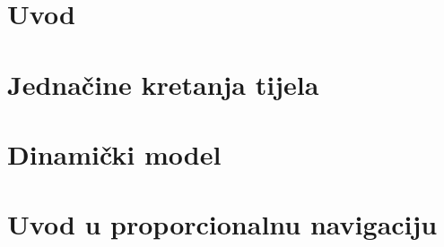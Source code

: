 \documentclass[12pt, twoside]{report}
\begin{document}




\tableofcontents

%

\chapter[]{Uvod}


\chapter{Jednačine kretanja tijela}



\chapter{Dinamički model}

\chapter{Uvod u proporcionalnu navigaciju}



\nocite{*}
\printbibliography
\end{document}
